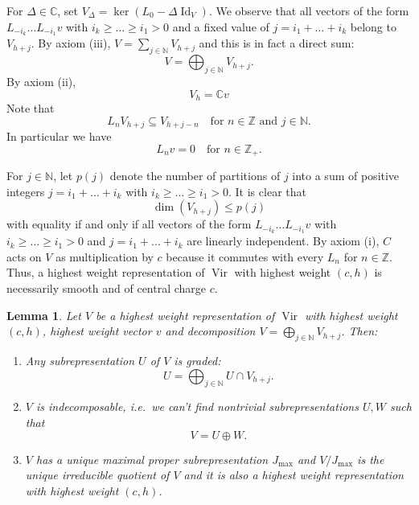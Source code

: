 \documentclass[a4paper, 12pt, reqno]{amsart}
\newtheorem{lemma}[theorem]{Lemma}
\theoremstyle{remark}
\numberwithin{equation}{subsection}
\DeclareMathOperator{\Vir}{Vir}
\DeclareMathOperator{\Id}{Id}
\begin{document}
For $\Delta \in \mathbb{C}$, set $V_{\Delta} = \ker(L_0 - \Delta\Id_V)$.
We observe that all vectors of the form $L_{-i_k}\dots L_{-i_1}v$ with $i_k \ge \dots \ge i_1 > 0$ and a fixed value of $j = i_1 + \dots + i_k$ belong to $V_{h + j}$.
By axiom (iii), $V = \sum_{j \in \mathbb{N}}V_{h + j}$ and this is in fact a direct sum:
\begin{equation}
  \label{eq:28}
  V = \bigoplus_{j \in \mathbb{N}}V_{h + j}.
\end{equation}
By axiom (ii),
\begin{equation}
  \label{eq:29}
  V_h = \mathbb{C}v
\end{equation}
Note that
\begin{equation}
  \label{eq:30}
  L_nV_{h + j}\subseteq V_{h + j - n} \quad \text{for }n \in \mathbb{Z}\text{ and }j \in \mathbb{N}.
\end{equation}
In particular we have
\begin{equation}
  \label{eq:31}
  L_nv = 0 \quad \text{for } n \in \mathbb{Z}_+.
\end{equation}

For $j \in \mathbb{N}$, let $p(j)$ denote the number of partitions of $j$ into a sum of positive integers $j = i_1 + \dots + i_k$ with $i_k \ge \dots \ge i_1 > 0$.
It is clear that
\begin{equation}
  \label{eq:32}
  \dim(V_{h + j}) \le p(j)
\end{equation}
with equality if and only if all vectors of the form $L_{-i_k}\dots L_{-i_1}v$ with $i_k \ge \dots \ge i_1 > 0$ and $j = i_1 + \dots + i_k$ are linearly independent.
By axiom (i), $C$ acts on $V$ as multiplication by $c$ because it commutes with every $L_n$ for $n \in \mathbb{Z}$.
Thus, a highest weight representation of $\Vir$ with highest weight $(c, h)$ is necessarily smooth and of central charge $c$.

\begin{lemma}
  \label{lmm:7}
  Let $V$ be a highest weight representation of $\Vir$ with highest weight $(c, h)$, highest weight vector $v$ and decomposition $V = \bigoplus_{j \in \mathbb{N}}V_{h + j}$.
  Then:
  \begin{enumerate}
  \item Any subrepresentation $U$ of $V$ is graded:
    \begin{equation*}
      U = \bigoplus_{j \in \mathbb{N}}U \cap V_{h + j}.
    \end{equation*}
  \item $V$ is indecomposable, i.e.\ we can't find nontrivial subrepresentations $U, W$ such that
    \begin{equation*}
      V = U \oplus W.
    \end{equation*}
  \item $V$ has a unique maximal proper subrepresentation $J_{\max}$ and $V/J_{\max}$ is the unique irreducible quotient of $V$ and it is also a highest weight representation with highest weight $(c, h)$.
  \end{enumerate}
\end{lemma}
\end{document}
